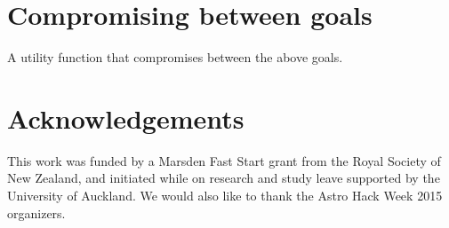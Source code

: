 \documentclass[a4paper,fleqn,usenatbib]{mnras}
\begin{document}
\section{Compromising between goals}
A utility function that compromises between the above goals.



\section*{Acknowledgements}
This work was funded by a Marsden Fast Start grant from the Royal Society of
New Zealand, and initiated while on research and study leave supported by
the University of Auckland. We would also like to thank the Astro Hack Week
2015 organizers.












\bsp	%
\label{lastpage}
\end{document}
